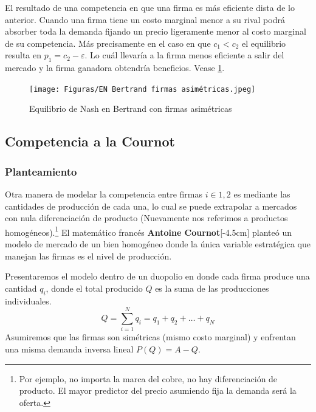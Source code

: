 El resultado de una competencia en que una firma es más eficiente dista de lo anterior. Cuando una firma tiene un costo marginal menor a su rival podrá absorber toda la demanda fijando un precio ligeramente menor al costo marginal de su competencia. Más precisamente en el caso en que $c_1<c_2$ el equilibrio resulta en $p_1 = c_2 - \varepsilon$. Lo cuál llevaría a la firma menos eficiente a salir del mercado y la firma ganadora obtendría beneficios. Vease \ref{fig:EN Bertrand asim}. 

\begin{figure}[htb]
    \centering
    \caption{Equilibrio de Nash en Bertrand con firmas asimétricas}
    \centering
    \texttt{[image: Figuras/EN Bertrand firmas asimétricas.jpeg]}
    \label{fig:EN Bertrand asim}
\end{figure}

\subsection{Competencia a la Cournot}

\subsubsection{Planteamiento}

Otra manera de modelar la competencia entre firmas $i \in 1,2$ es mediante las cantidades de producción de cada una, lo cual se puede extrapolar a mercados con nula diferenciación de producto (Nuevamente nos referimos a productos homogéneos).\footnote{Por ejemplo, no importa la marca del cobre, no hay diferenciación de producto. El mayor predictor del precio asumiendo fija la demanda será la oferta.} El matemático francés \textbf{Antoine Cournot}[-4.5cm] planteó un modelo de mercado de un bien homogéneo donde la única variable estratégica que manejan las firmas es el nivel de producción.

Presentaremos el modelo dentro de un duopolio en donde cada firma produce una cantidad $q_i$, donde el total producido $Q$ es la suma de las producciones individuales.
\begin{equation}
    Q = \sum_{i=1}^N q_i = q_1 + q_2 + \ldots +q_N
\end{equation}
Asumiremos que las firmas son simétricas (mismo costo marginal) y enfrentan una misma demanda inversa lineal $P(Q) = A - Q$. 

